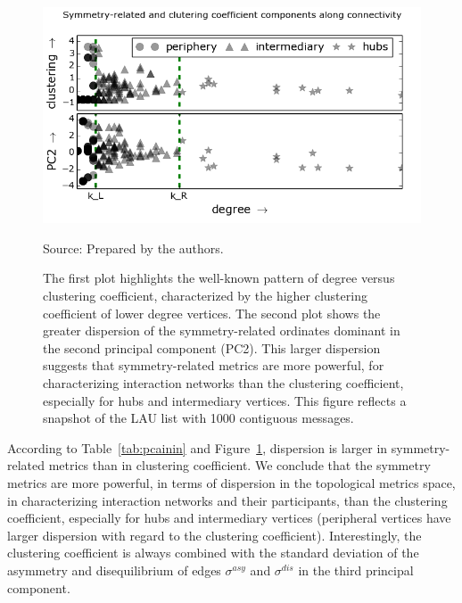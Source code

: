 \begin{figure} 
\centering
\caption{The first plot highlights the well-known pattern of degree versus clustering coefficient, characterized by the higher clustering coefficient of lower degree vertices.
    The second plot shows the greater dispersion of the symmetry-related ordinates dominant in the second principal component (PC2).
This larger dispersion suggests that symmetry-related metrics are more powerful,
for characterizing interaction networks than the clustering coefficient,
especially for hubs and intermediary vertices.
This figure reflects a snapshot of the LAU list with 1000 contiguous messages.}
\includegraphics[width=.45\textwidth]{figs/im13PCAPLOT__}

\label{fig:sym}
\begin{flushleft}
		Source: Prepared by the authors.\
\end{flushleft}
\end{figure}

According to Table~\ref{tab:pcainin} and Figure~\ref{fig:sym},
dispersion is larger in symmetry-related metrics than in clustering coefficient.
We conclude that the symmetry metrics are more powerful, in terms of dispersion in the topological metrics space, in characterizing interaction networks and their participants, than the clustering coefficient, especially for hubs and intermediary vertices (peripheral vertices have larger dispersion with regard to the clustering coefficient).
Interestingly, the clustering coefficient is always combined
with the standard deviation of the asymmetry and disequilibrium
of edges $\sigma^{asy}$ and $\sigma^{dis}$ in the third principal component.

